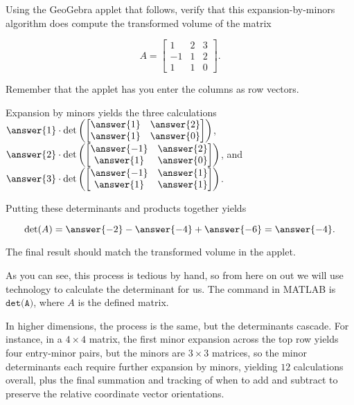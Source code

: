 \documentclass{ximera}
\begin{document}
\begin{example}
    Using the GeoGebra applet that follows, verify that this expansion-by-minors algorithm does compute the transformed volume of the matrix 
    
    $$A=\begin{bmatrix}
        1&2&3\\-1&1&2\\1&1&0
    \end{bmatrix}.$$

    Remember that the applet has you enter the columns as row vectors. 

    Expansion by minors yields the three calculations $\answer{1}\cdot\mbox{det}\left(\begin{bmatrix}
        \answer{1} & \answer{2}\\\answer{1}&\answer{0}
    \end{bmatrix}\right)$, $\answer{2}\cdot\mbox{det}\left(\begin{bmatrix}
        \answer{-1} & \answer{2}\\\answer{1}&\answer{0}
    \end{bmatrix}\right)$, and $\answer{3}\cdot\mbox{det}\left(\begin{bmatrix}
        \answer{-1} & \answer{1}\\\answer{1}&\answer{1}
    \end{bmatrix}\right)$.

    Putting these determinants and products together yields

    $$\mbox{det}(A)=\answer{-2}-\answer{-4}+\answer{-6}=\answer{-4}.$$

    The final result should match the transformed volume in the applet.
\end{example}

As you can see, this process is tedious by hand, so from here on out we will use technology to calculate the determinant for us. The command in MATLAB is $\texttt{det(A)}$, where $A$ is the defined matrix. 

In higher dimensions, the process is the same, but the determinants cascade. For instance, in a $4\times 4$ matrix, the first minor expansion across the top row yields four entry-minor pairs, but the minors are $3\times 3$ matrices, so the minor determinants each require further expansion by minors, yielding $12$ calculations overall, plus the final summation and tracking of when to add and subtract to preserve the relative coordinate vector orientations.
\end{document}
